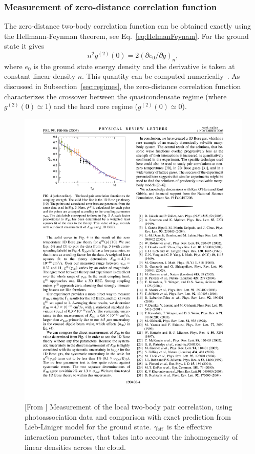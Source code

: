\documentclass[onecolumn,amsfonts,showpacs,superscriptaddress]{revtex4-1}
\begin{document}
\subsubsection{Measurement of zero-distance correlation function}
\label{subsec:g20}
The zero-distance two-body correlation function can be obtained exactly using the Hellmann-Feynman theorem, see Eq.~\eqref{eq:HelmanFeynam}.
For the ground state it gives
\begin{equation}
n^2g^{(2)}(0)=2 \left( \partial e_0/\partial g \right)_n    ,
\end{equation}
where $e_0$ is the ground state energy density and the derivative is taken at constant linear density $n$. 
This quantity can be computed  numerically~\citep{lieb_exact_1963}.
As discussed in Subsection~\ref{sec:regimes}, the zero-distance correlation function characterizes the crossover between the quasicondensate regime  (where $g^{(2)}(0) \simeq 1$) and the hard core regime ($g^{(2)}(0) \simeq 0$).

\begin{figure}
    \centering
    \includegraphics[viewport=43 585 298 748,clip]{figures/PairCorrelationWeiss.pdf}
    \caption{[From \cite{kinoshita_local_2005}] Measurement of the local two-body pair correlation, using photoassociation data and comparison with 
    exact prediction from Lieb-Liniger model for the ground state. $\gamma_{\rm eff}$ is the effective interaction parameter, that takes into account the inhomogeneity of linear densities across the cloud.}
    \label{fig:PairCorrelationWeiss}
\end{figure}
\end{document}
